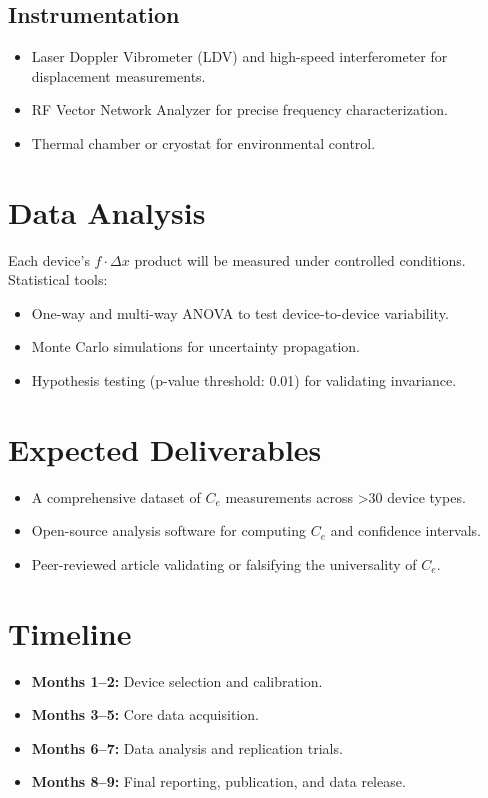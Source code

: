 \documentclass[11pt]{article}
\begin{document}
        \subsection*{Instrumentation}
        \begin{itemize}
            \item Laser Doppler Vibrometer (LDV) and high-speed interferometer for displacement measurements.
            \item RF Vector Network Analyzer for precise frequency characterization.
            \item Thermal chamber or cryostat for environmental control.
        \end{itemize}

        \section{Data Analysis}
        Each device's \( f \cdot \Delta x \) product will be measured under controlled conditions. Statistical tools:
        \begin{itemize}
            \item One-way and multi-way ANOVA to test device-to-device variability.
            \item Monte Carlo simulations for uncertainty propagation.
            \item Hypothesis testing (p-value threshold: 0.01) for validating invariance.
        \end{itemize}

        \section{Expected Deliverables}
        \begin{itemize}
            \item A comprehensive dataset of \( C_e \) measurements across >30 device types.
            \item Open-source analysis software for computing \( C_e \) and confidence intervals.
            \item Peer-reviewed article validating or falsifying the universality of \( C_e \).
        \end{itemize}

        \section{Timeline}
        \begin{itemize}
            \item \textbf{Months 1–2:} Device selection and calibration.
            \item \textbf{Months 3–5:} Core data acquisition.
            \item \textbf{Months 6–7:} Data analysis and replication trials.
            \item \textbf{Months 8–9:} Final reporting, publication, and data release.
        \end{itemize}
\end{document}
